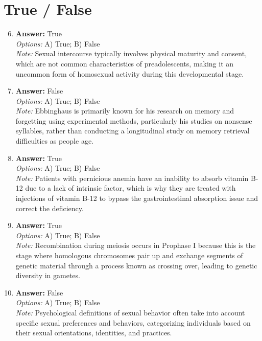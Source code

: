 \documentclass[12pt]{article}
\begin{document}
\section*{True / False}
\begin{enumerate}[label=\arabic*.]
\setcounter{enumi}{5}
\item \textbf{Answer:} True
\\ \textit{Options:} A) True; B) False
\\ \textit{Note:} Sexual intercourse typically involves physical maturity and consent, which are not common characteristics of preadolescents, making it an uncommon form of homosexual activity during this developmental stage.
\item \textbf{Answer:} False
\\ \textit{Options:} A) True; B) False
\\ \textit{Note:} Ebbinghaus is primarily known for his research on memory and forgetting using experimental methods, particularly his studies on nonsense syllables, rather than conducting a longitudinal study on memory retrieval difficulties as people age.
\item \textbf{Answer:} True
\\ \textit{Options:} A) True; B) False
\\ \textit{Note:} Patients with pernicious anemia have an inability to absorb vitamin B-12 due to a lack of intrinsic factor, which is why they are treated with injections of vitamin B-12 to bypass the gastrointestinal absorption issue and correct the deficiency.
\item \textbf{Answer:} True
\\ \textit{Options:} A) True; B) False
\\ \textit{Note:} Recombination during meiosis occurs in Prophase I because this is the stage where homologous chromosomes pair up and exchange segments of genetic material through a process known as crossing over, leading to genetic diversity in gametes.
\item \textbf{Answer:} False
\\ \textit{Options:} A) True; B) False
\\ \textit{Note:} Psychological definitions of sexual behavior often take into account specific sexual preferences and behaviors, categorizing individuals based on their sexual orientations, identities, and practices.
\end{enumerate}
\end{document}

